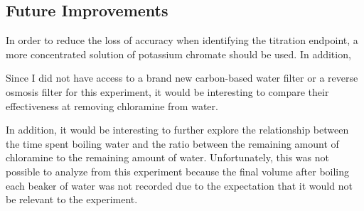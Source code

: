 \documentclass[11pt]{article}
\begin{document}
\subsection{Future Improvements}

In order to reduce the loss of accuracy when identifying the titration endpoint, a more concentrated solution of potassium chromate should be used. In addition,

Since I did not have access to a brand new carbon-based water filter or a reverse osmosis filter for this experiment, it would be interesting to compare their effectiveness at removing chloramine from water.

In addition, it would be interesting to further explore the relationship between the time spent boiling water and the ratio between the remaining amount of chloramine to the remaining amount of water. Unfortunately, this was not possible to analyze from this experiment because the final volume after boiling each beaker of water was not recorded due to the expectation that it would not be relevant to the experiment.

\newpage

\nocite{*}
\setlength{}
\printbibliography
\end{document}
